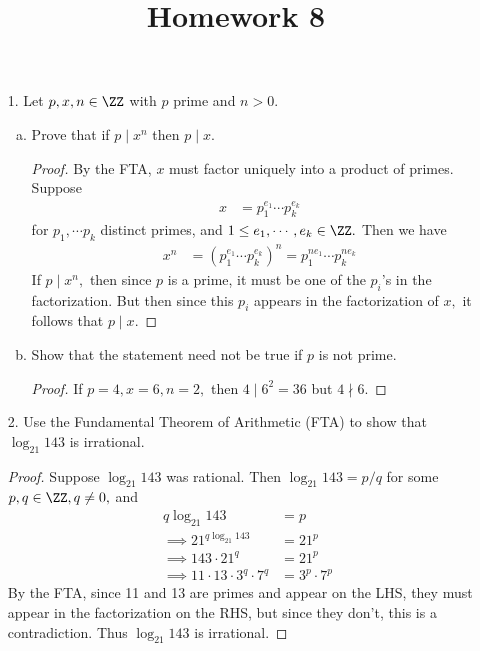 \documentclass{article}
\begin{document}
\title{Homework 8}
\maketitle
\thispagestyle{fancy}

\begin{itemize}
	\item[1.] Let $p, x, n\in \ZZ$ with $p$ prime and $n>0.$
		\begin{enumerate}[(a)]
			\item Prove that if $p\mid x^n$ then $p\mid x.$
				\begin{proof}
					By the FTA, $x$ must factor uniquely into a product of primes. Suppose
					\begin{align*}
						x &= p_1^{e_1} \cdots p_k^{e_k}
					\end{align*}
					for $p_1, \cdots p_k$ distinct primes, and $1\le e_1, \cdots, e_k\in\ZZ.$ Then we have
					\begin{align*}
						x^n &= \left(p_1^{e_1}\cdots p_k^{e_k}\right)^n = p_1^{ne_1}\cdots p_k^{ne_k}
					\end{align*}
					If $p\mid x^n,$ then since $p$ is a prime, it must be one of the $p_i$'s in the factorization. But then since this $p_i$ appears in the factorization of $x,$ it follows that $p\mid x.$
				\end{proof}

			\item Show that the statement need not be true if $p$ is not prime.
				\begin{proof}
					If $p=4, x=6, n=2,$ then $4\mid 6^2=36$ but $4\nmid 6.$
				\end{proof}
				
		\end{enumerate}

	\item[2.] Use the Fundamental Theorem of Arithmetic (FTA) to show that $\log_{21} 143$ is irrational.
		\begin{proof}
			Suppose $\log_{21}143$ was rational. Then $\log_{21}143=p/q$ for some $p, q\in\ZZ, q\neq 0,$ and
			\begin{align*}
				q\log_{21}143 &= p \\
				\implies 21^{q\log_{21}143} &= 21^p \\
				\implies 143\cdot 21^q &= 21^p \\
				\implies 11\cdot 13\cdot 3^q\cdot 7^q &= 3^p \cdot 7^p
			\end{align*}
			By the FTA, since 11 and 13 are primes and appear on the LHS, they must appear in the factorization on the RHS, but since they don't, this is a contradiction. Thus $\log_{21}143$ is irrational.
		\end{proof}


\end{itemize}
\end{document}
